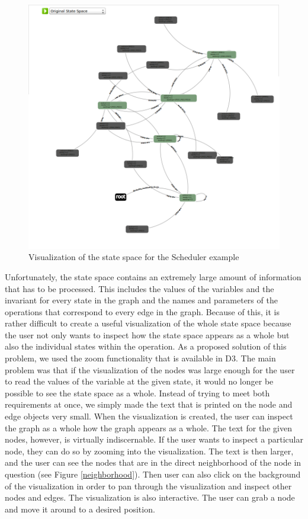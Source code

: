 \begin{center}
\begin{figure}[h!]
\includegraphics[width=13cm]{bilder/ss-zoomedOut.png}
\caption{Visualization of the state space for the Scheduler example}
\label{zoomedOut}
\end{figure}
\end{center}

Unfortunately, the state space contains an extremely large amount of information that has to be processed. This includes the values of the variables and the invariant for every state in the graph and the names and parameters of the operations that correspond to every edge in the graph. Because of this, it is rather difficult to create a useful visualization of the whole state space because the user not only wants to inspect how the state space appears as a whole but also the individual states within the operation. As a proposed solution of this problem, we used the zoom functionality that is available in D3. The main problem was that if the visualization of the nodes was large enough for the user to read the values of the variable at the given state, it would no longer be possible to see the state space as a whole. Instead of trying to meet both requirements at once, we simply made the text that is printed on the node and edge objects very small. When the visualization is created, the user can inspect the graph as a whole how the graph appears as a whole. The text for the given nodes, however, is virtually indiscernable. If the user wants to inspect a particular node, they can do so by zooming into the visualization. The text is then larger, and the user can see the nodes that are in the direct neighborhood of the node in question (see Figure \ref{neighborhood}). Then user can also click on the background of the visualization in order to pan through the visualization and inspect other nodes and edges. The visualization is also interactive. The user can grab a node and move it around to a desired position.

